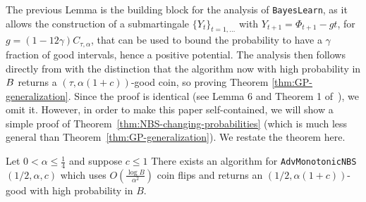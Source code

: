 The previous Lemma is the building block for the analysis of \texttt{BayesLearn}, as it allows the construction of a submartingale $\{Y_{t}\}_{t=1,\dots}$ with $Y_{t+1} = \Phi_{t+1}-gt$, for $g=(1-12\gamma)C_{\tau, \alpha}$,
%
that can be used to bound the probability to have a $\gamma$ fraction of good intervals, hence a positive potential. The analysis then follows directly from \cite{gretta2023sharp} with the distinction that the algorithm now with high probability in $B$ returns a $(\tau,\alpha(1+c))$-good coin, so proving Theorem \ref{thm:GP-generalization}. Since the proof is identical (see Lemma 6 and Theorem 1 of~\cite{gretta2023sharp}), we omit it. 
However, in order to make this paper self-contained, we will show a simple proof of Theorem~\ref{thm:NBS-changing-probabilities} (which is much less general than Theorem~\ref{thm:GP-generalization}). We restate the theorem here.
\begin{theorem}
Let $0<\alpha\leq \frac{1}{4}$ and suppose $c\leq 1$
There exists an algorithm for \texttt{AdvMonotonicNBS}$(1/2, \alpha, c)$ which uses $O\left(\tfrac{\log B}{\alpha^2}\right)$ coin flips and returns an $(1/2,\alpha(1+c))$-good with high probability in $B$.
\end{theorem}

